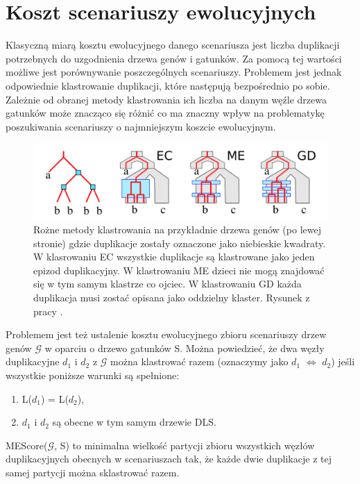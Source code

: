 \documentclass[licencjacka]{pracamgr}
\begin{document}
\section{Koszt scenariuszy ewolucyjnych}

Klasyczną miarą kosztu ewolucyjnego danego scenariusza jest liczba duplikacji potrzebnych do uzgodnienia drzewa genów i gatunków. Za pomocą tej wartości możliwe jest porównywanie poszczególnych scenariuszy.
Problemem jest jednak odpowiednie klastrowanie duplikacji, które następują bezpośrednio po sobie. Zależnie od obranej metody klastrowania ich liczba na danym węźle drzewa gatunków może znacząco się różnić co ma znaczny wpływ na problematykę poszukiwania scenariuszy o najmniejszym koszcie ewolucyjnym. 

\begin{figure}[H]
  \centering
  \includegraphics[width=140mm]{./pictures/clas_type.png}
  \caption{Rożne metody klastrowania na przykładnie drzewa genów (po lewej stronie) gdzie duplikacje zostały oznaczone jako niebieskie kwadraty. W klasrowaniu EC wszystkie duplikacje są klastrowane jako jeden epizod duplikacyjny. W klastrowaniu ME dzieci nie mogą znajdować się w tym samym klastrze co ojciec. W klastrowaniu GD każda duplikacja musi zostać opisana jako oddzielny klaster. Rysunek z pracy \cite{pasz}.}
\end{figure}


Problemem jest też ustalenie kosztu ewolucyjnego zbioru scenariuszy drzew genów $\mathcal{G}$ w oparciu o drzewo gatunków S. Można powiedzieć, że dwa węzły duplikacyjne \textit{$d_1$} i \textit{$d_2$} z $\mathcal{G}$ można klastrować razem (oznaczymy jako \textit{$d_1$} $\Longleftrightarrow$ \textit{$d_2$})  jeśli wszystkie poniższe warunki są spełnione:
\begin{enumerate}
\item L($d_1$) = L(\textit{$d_2$}),
\item \textit{$d_1$} i \textit{$d_2$} są obecne w tym samym drzewie DLS.
\end{enumerate}

MEScore($\mathcal{G}$, S) to minimalna wielkość partycji zbioru wszystkich węzłów duplikacyjnych obecnych w scenariuszach tak, że każde dwie duplikacje z tej samej partycji można sklastrować razem.
\end{document}
